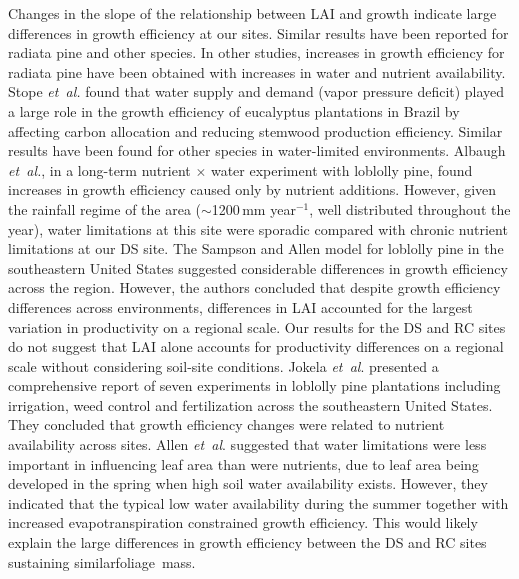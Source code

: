 \documentclass[final]{foresj}
\begin{document}
Changes in the slope of the relationship between LAI and
growth indicate large differences in growth efficiency at
our sites. Similar results have been reported for radiata
pine and other species.\cite{7,80,81,82} In other studies,
increases in growth efficiency for radiata pine have been
obtained with increases in water and nutrient
availability.\cite{8,83} Stope \textit{et~al.}\cite{84} found that
water supply and demand (vapor pressure deficit) played a
large role in the growth efficiency of eucalyptus
plantations in Brazil by affecting carbon allocation and
reducing stemwood production efficiency. Similar results
have been found for other species in water-limited
environments.\cite{83} Albaugh \textit{et~al.},\cite{82} in a
long-term nutrient $\times$ water experiment with loblolly
pine, found increases in growth efficiency caused only by
nutrient additions. However, given the rainfall regime of
the area ($\sim$1200\,mm year$^{-1}$, well distributed
throughout the year), water limitations at this site were
sporadic compared with chronic nutrient limitations at our
DS site. The Sampson and Allen\cite{85} model for loblolly
pine in the southeastern United States suggested
considerable differences in growth efficiency across the
region. However, the authors concluded that despite growth
efficiency differences across environments, differences in
LAI accounted for the largest variation in productivity on
a regional scale. Our results for the DS and RC sites do
not suggest that LAI alone accounts for productivity
differences on a regional scale without considering
soil-site conditions. Jokela \textit{et~al}.\cite{81}
presented a comprehensive report of seven experiments in
loblolly pine plantations including irrigation, weed
control and fertilization across the southeastern United
States. They concluded that growth efficiency changes were
related to nutrient availability across sites. Allen
\textit{et~al}.\cite{86} suggested that water limitations
were less important in influencing leaf area than were
nutrients, due to leaf area being developed in the spring
when high soil water availability exists. However, they
indicated that the typical low water availability during
the summer together with increased evapotranspiration
constrained growth efficiency. This would likely explain
the large differences in growth efficiency between the DS
and RC sites sustaining similar\break foliage~mass.
\end{document}
